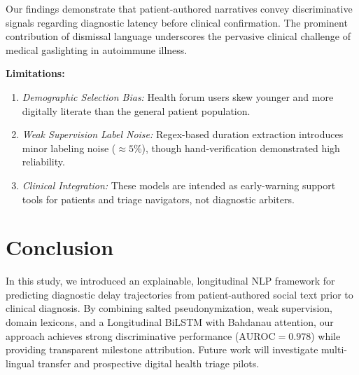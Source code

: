 \documentclass[runningheads]{llncs}
\begin{document}
Our findings demonstrate that patient-authored narratives convey discriminative signals regarding diagnostic latency before clinical confirmation. The prominent contribution of dismissal language underscores the pervasive clinical challenge of medical gaslighting in autoimmune illness.

\noindent\textbf{Limitations:}
\begin{enumerate}
    \item \emph{Demographic Selection Bias:} Health forum users skew younger and more digitally literate than the general patient population.
    \item \emph{Weak Supervision Label Noise:} Regex-based duration extraction introduces minor labeling noise ($\approx 5\%$), though hand-verification demonstrated high reliability.
    \item \emph{Clinical Integration:} These models are intended as early-warning support tools for patients and triage navigators, not diagnostic arbiters.
\end{enumerate}

\section{Conclusion}
\label{sec:conclusion}

In this study, we introduced an explainable, longitudinal NLP framework for predicting diagnostic delay trajectories from patient-authored social text prior to clinical diagnosis. By combining salted pseudonymization, weak supervision, domain lexicons, and a Longitudinal BiLSTM with Bahdanau attention, our approach achieves strong discriminative performance ($\text{AUROC} = 0.978$) while providing transparent milestone attribution. Future work will investigate multi-lingual transfer and prospective digital health triage pilots.



\end{document}
